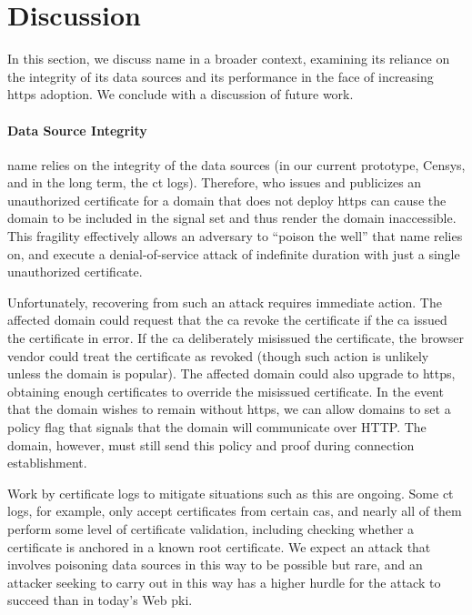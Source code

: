 \section{Discussion}
\label{sec:discussion}

In this section, we discuss \ac{name} in a broader context, examining its
reliance on the integrity of its data sources and its performance in
the face of increasing \ac{https} adoption. We conclude with a discussion of
future work.

\paragraph{Data Source Integrity}

\ac{name} relies on the integrity of the data sources (in our current prototype,
Censys, and in the long term, the \ac{ct} logs). Therefore,  who issues
and publicizes an unauthorized certificate for a domain that does not deploy
\ac{https} can cause the domain to be included in the signal set and thus render
the domain inaccessible. This fragility effectively allows an adversary to
``poison the well'' that \ac{name} relies on, and execute a denial-of-service
attack of indefinite duration with just a single unauthorized certificate.

Unfortunately, recovering from such an attack requires immediate action. The
affected domain could request that the \ac{ca} revoke the certificate if the
\ac{ca} issued the certificate in error. If the \ac{ca} deliberately misissued
the certificate, the browser vendor could treat the certificate as revoked
(though such action is unlikely unless the domain is popular). The affected
domain could also upgrade to \ac{https}, obtaining enough certificates to
override the misissued certificate. In the event that the domain wishes to
remain without \ac{https}, we can allow domains to set a policy flag that
signals that the domain will communicate over HTTP. The domain, however, must
still send this policy and proof during connection establishment.

Work by certificate logs to mitigate situations such as this are ongoing. Some
\ac{ct} logs, for example, only accept certificates from certain \acp{ca}, and
nearly all of them perform some level of certificate validation, including
checking whether a certificate is anchored in a known root certificate. We
expect an attack that involves poisoning data sources in this way to be possible
but rare, and an attacker seeking to carry out  in this way has a
higher hurdle for the attack to succeed than in today's Web \ac{pki}.

